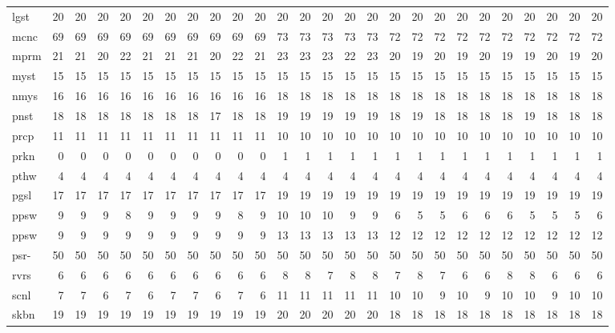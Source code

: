 \begin{center}
\begin{tabular}{lrrrrrrrrrrrrrrrrrrrrrrrrr}
lgst & 20 & 20 & 20 & 20 & 20 & 20 & 20 & 20 & 20 & 20 & 20 & 20 & 20 & 20 & 20 & 20 & 20 & 20 & 20 & 20 & 20 & 20 & 20 & 20 & 20\\
mcnc & 69 & 69 & 69 & 69 & 69 & 69 & 69 & 69 & 69 & 69 & 73 & 73 & 73 & 73 & 73 & 72 & 72 & 72 & 72 & 72 & 72 & 72 & 72 & 72 & 72\\
mprm & 21 & 21 & 20 & 22 & 21 & 21 & 21 & 20 & 22 & 21 & 23 & 23 & 23 & 22 & 23 & 20 & 19 & 20 & 19 & 20 & 19 & 19 & 20 & 19 & 20\\
myst & 15 & 15 & 15 & 15 & 15 & 15 & 15 & 15 & 15 & 15 & 15 & 15 & 15 & 15 & 15 & 15 & 15 & 15 & 15 & 15 & 15 & 15 & 15 & 15 & 15\\
nmys & 16 & 16 & 16 & 16 & 16 & 16 & 16 & 16 & 16 & 16 & 18 & 18 & 18 & 18 & 18 & 18 & 18 & 18 & 18 & 18 & 18 & 18 & 18 & 18 & 18\\
pnst & 18 & 18 & 18 & 18 & 18 & 18 & 18 & 17 & 18 & 18 & 19 & 19 & 19 & 19 & 19 & 18 & 19 & 18 & 18 & 18 & 18 & 19 & 18 & 18 & 18\\
prcp & 11 & 11 & 11 & 11 & 11 & 11 & 11 & 11 & 11 & 11 & 10 & 10 & 10 & 10 & 10 & 10 & 10 & 10 & 10 & 10 & 10 & 10 & 10 & 10 & 10\\
prkn & 0 & 0 & 0 & 0 & 0 & 0 & 0 & 0 & 0 & 0 & 1 & 1 & 1 & 1 & 1 & 1 & 1 & 1 & 1 & 1 & 1 & 1 & 1 & 1 & 1\\
pthw & 4 & 4 & 4 & 4 & 4 & 4 & 4 & 4 & 4 & 4 & 4 & 4 & 4 & 4 & 4 & 4 & 4 & 4 & 4 & 4 & 4 & 4 & 4 & 4 & 4\\
pgsl & 17 & 17 & 17 & 17 & 17 & 17 & 17 & 17 & 17 & 17 & 19 & 19 & 19 & 19 & 19 & 19 & 19 & 19 & 19 & 19 & 19 & 19 & 19 & 19 & 19\\
ppsw & 9 & 9 & 9 & 8 & 9 & 9 & 9 & 9 & 8 & 9 & 10 & 10 & 10 & 9 & 9 & 6 & 5 & 5 & 6 & 6 & 6 & 5 & 5 & 5 & 6\\
ppsw & 9 & 9 & 9 & 9 & 9 & 9 & 9 & 9 & 9 & 9 & 13 & 13 & 13 & 13 & 13 & 12 & 12 & 12 & 12 & 12 & 12 & 12 & 12 & 12 & 12\\
psr- & 50 & 50 & 50 & 50 & 50 & 50 & 50 & 50 & 50 & 50 & 50 & 50 & 50 & 50 & 50 & 50 & 50 & 50 & 50 & 50 & 50 & 50 & 50 & 50 & 50\\
rvrs & 6 & 6 & 6 & 6 & 6 & 6 & 6 & 6 & 6 & 6 & 8 & 8 & 7 & 8 & 8 & 7 & 8 & 7 & 6 & 6 & 8 & 8 & 6 & 6 & 6\\
scnl & 7 & 7 & 6 & 7 & 6 & 7 & 7 & 6 & 7 & 6 & 11 & 11 & 11 & 11 & 11 & 10 & 10 & 9 & 10 & 9 & 10 & 10 & 9 & 10 & 10\\
skbn & 19 & 19 & 19 & 19 & 19 & 19 & 19 & 19 & 19 & 19 & 20 & 20 & 20 & 20 & 20 & 18 & 18 & 18 & 18 & 18 & 18 & 18 & 18 & 18 & 18\\

\end{tabular}
\end{center}

